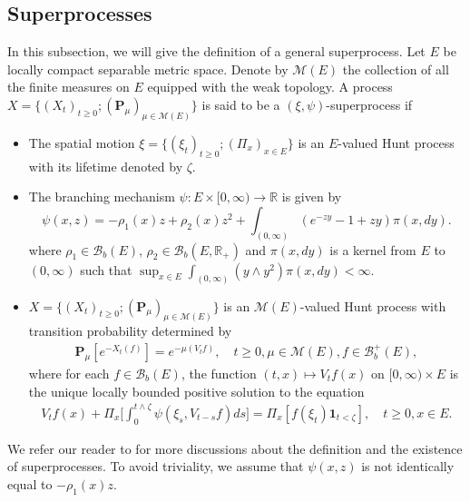 \documentclass[12pt,a4paper]{amsart}
\theoremstyle{plain}
\theoremstyle{definition}
\numberwithin{equation}{section}
\begin{document}
\subsection{Superprocesses}
\label{sec: definition of superprocess}
    In this subsection, we will give the definition of a general superprocess.
Let $E$ be locally compact separable metric space. Denote by $\mathcal M(E)$ the collection of all the finite measures on $E$ equipped with the weak topology.
    A process $X=\{(X_t)_{t\geq 0}; (\mathbf P_\mu)_{\mu \in \mathcal M(E)}\}$ is said to be a $(\xi,\psi)$-superprocess if
\begin{itemize}
\item
    The spatial motion $\xi=\{(\xi_t)_{t\geq 0};(\Pi_x)_{x\in E}\}$ is an $E$-valued Hunt process with its lifetime denoted by $\zeta$.
\item
    The branching mechanism $\psi: E\times[0,\infty) \to \mathbb R$ is given by
\begin{equation}
\label{eq: branching mechanism}
    \psi(x,z)=
   - \rho_1(x) z + \rho_2 (x) z^2 + \int_{(0,\infty)} (e^{-zy} - 1 + zy) \pi(x,dy).
\end{equation}
    where $\rho_1 \in \mathcal B_b(E)$, $\rho_2 \in \mathcal B_b(E, \mathbb R_+)$ and $\pi(x,dy)$ is a kernel from $E$ to $(0,\infty)$ such that $\sup_{x\in E} \int_{(0,\infty)} (y\wedge y^2) \pi(x,dy) < \infty$.
\item
    $X=\{(X_t)_{t\geq 0}; (\mathbf P_\mu)_{\mu \in \mathcal M(E)}\}$ is an $\mathcal M(E)$-valued Hunt process with transition probability determined by
\begin{equation}\begin{split}
    \mathbf P_\mu [e^{-X_t(f)}] = e^{-\mu(V_tf)},
    \quad t\geq 0, \mu \in \mathcal M(E), f\in \mathcal B^+_b(E),
\end{split}\end{equation}
    where for each $f\in \mathcal B_b(E)$, the function $(t,x)\mapsto V_tf(x)$ on $[0,\infty) \times E$ is the unique locally bounded positive solution to the equation
\begin{equation}\begin{split}\label{eq:FKPP_in_definition}
    V_tf(x) + \Pi_x \Big[  \int_0^{t\wedge \zeta} \psi(\xi_s,V_{t-s}f)ds \Big]
    = \Pi_x [ f(\xi_t)\mathbf 1_{t<\zeta} ],
    \quad t \geq 0, x \in E.
\end{split}\end{equation}
\end{itemize}
    We refer our reader to \cite{Li2011Measure-valued} for more discussions about the definition and the existence of superprocesses.
    To avoid triviality, we assume that 
   $\psi(x,z)$ is not identically equal to $-\rho_1(x)z$.
\end{document}
